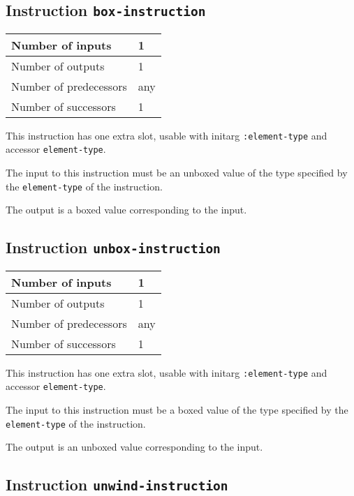 \subsection{Instruction \texttt{box-instruction}}
\label{hir-instruction-box}

\begin{tabular}{|l|l|}
  \hline
  Number of inputs & 1\\
  \hline
  Number of outputs & 1\\
  \hline
  Number of predecessors & any\\
  \hline
  Number of successors & 1\\
  \hline
\end{tabular}

This instruction has one extra slot, usable with initarg
\texttt{:element-type} and accessor \texttt{element-type}.

The input to this instruction must be an unboxed value of the type
specified by the \texttt{element-type} of the instruction.

The output is a boxed value corresponding to the input.

\subsection{Instruction \texttt{unbox-instruction}}
\label{hir-instruction-unbox}

\begin{tabular}{|l|l|}
\hline
Number of inputs & 1\\
\hline
Number of outputs & 1\\
\hline
Number of predecessors & any\\
\hline
Number of successors & 1\\
\hline
\end{tabular}

This instruction has one extra slot, usable with initarg
\texttt{:element-type} and accessor \texttt{element-type}.

The input to this instruction must be a boxed value of the type
specified by the \texttt{element-type} of the instruction.

The output is an unboxed value corresponding to the input.

\subsection{Instruction \texttt{unwind-instruction}}
\label{hir-instruction-unwind}

